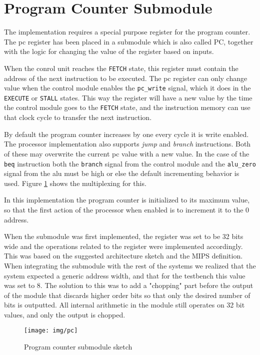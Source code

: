 \section{Program Counter Submodule}
The implementation requires a special purpose register for the program counter.
The \gls{pc} register has been placed in a submodule which is also called PC,
together with the logic for changing the value of the register based on inputs.

When the conrol unit reaches the \texttt{FETCH} state,
this register must contain the address of the next instruction to be executed.
The \gls{pc} register can only change value when the control module enables the \texttt{pc\_write} signal,
which it does in the \texttt{EXECUTE} or \texttt{STALL} states.
This way the register will have a new value by the time the control module goes to the \texttt{FETCH} state,
and the instruction memory can use that clock cycle to transfer the next instruction.

By default the program counter increases by one every cycle it is write enabled.
The processor implementation also supports \textit{jump} and \textit{branch} instructions.
Both of these may overwrite the current \gls{pc} value with a new value.
In the case of the \texttt{beq} instruction both the \texttt{branch} signal from the control module and the \texttt{alu\_zero} signal from the \gls{alu} must be high or else the default incrementing behavior is used.
Figure \ref{fig:pc} shows the multiplexing for this.

In this implementation the program counter is initialized to its maximum value,
so that the first action of the processor when enabled is to increment it to the 0 address.

When the submodule was first implemented,
the register was set to be 32 bits wide and the operations related to the register were implemented accordingly.
This was based on the suggested architecture sketch and the MIPS definition.
When integrating the submodule with the rest of the systems we realized that the system expected a generic address width, and that for the testbench this value was set to 8.
The solution to this was to add a "chopping" part before the output of the module that discards higher order bits so that only the desired number of bits is outputted.
All internal arithmetic in the module still operates on 32 bit values,
and only the output is chopped.

\begin{figure}[h]
    \centering
    \texttt{[image: img/pc]}
    \caption{Program counter submodule sketch}
    \label{fig:pc}
\end{figure}

